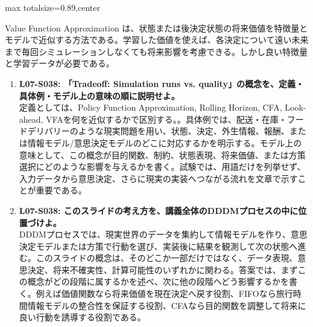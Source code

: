 \begin{minipage}[t]{0.58\textwidth}
\begin{adjustbox}{max totalsize={\textwidth}{0.89\textheight},center}
\begin{minipage}{\textwidth}
Value Function Approximation は、状態または後決定状態の将来価値を特徴量とモデルで近似する方法である。学習した価値を使えば、各決定について遠い未来まで毎回シミュレーションしなくても将来影響を考慮できる。しかし良い特徴量と学習データが必要である。\par{}\begin{enumerate}\item \textbf{L07-S038: 「Tradeoff: Simulation runs vs. quality」の概念を、定義・具体例・モデル上の意味の順に説明せよ。}\\定義としては、Policy Function Approximation, Rolling Horizon, CFA, Look-ahead, VFAを何を近似するかで区別する。。具体例では、配送・在庫・フードデリバリーのような現実問題を用い、状態、決定、外生情報、報酬、または情報モデル/意思決定モデルのどこに対応するかを明示する。モデル上の意味として、この概念が目的関数、制約、状態表現、将来価値、または方策選択にどのような影響を与えるかを書く。試験では、用語だけを列挙せず、入力データから意思決定、さらに現実の実装へつながる流れを文章で示すことが重要である。\item \textbf{L07-S038: このスライドの考え方を、講義全体のDDDMプロセスの中に位置づけよ。}\\DDDMプロセスでは、現実世界のデータを集約して情報モデルを作り、意思決定モデルまたは方策で行動を選び、実装後に結果を観測して次の状態へ進む。このスライドの概念は、そのどこか一部だけではなく、データ表現、意思決定、将来不確実性、計算可能性のいずれかに関わる。答案では、まずこの概念がどの段階に属するかを述べ、次に他の段階へどう影響するかを書く。例えば価値関数なら将来価値を現在決定へ戻す役割、FIFOなら旅行時間情報モデルの整合性を保証する役割、CFAなら目的関数を調整して将来に良い行動を誘導する役割である。\end{enumerate}
\end{minipage}
\end{adjustbox}
\end{minipage}


